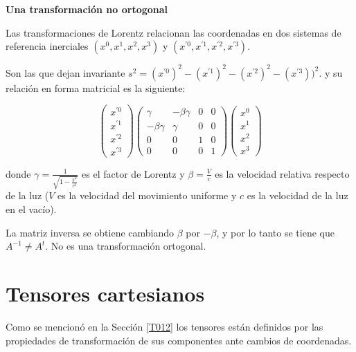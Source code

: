 \bigskip
\begin{example}
\textbf{Una transformación no ortogonal}

Las transformaciones de Lorentz relacionan las coordenadas en dos sistemas de referencia inerciales
$( x^0, x^1, x^2, x^3) $  y $  (x^{\prime 0}, x^{\prime 1}, x^{\prime 2}, x^{\prime 3})$.

Son las que dejan invariante 
$ s^2=  (x^{\prime 0})^2- (x^{\prime 1})^2 - ( x^{\prime 2})^2- (x^{\prime 3}))^2$.
\noindent
y su relación en forma matricial es la siguiente:



$$\left( \begin{array}{c} x^{\prime 0} \\ x^{\prime 1} 
\\  x^{\prime 2}\\ x^{\prime 3} 
\end{array}
 \right)  \left(\begin{array}{cccc} \gamma & -\beta \gamma &  0 & 0 \\-\beta \gamma  & \gamma & 0  & 0
\\  0 & 0  &  1 & 0 \\ 0 & 0 & 0 & 1
\end{array}
 \right)\left(\begin{array}{c} x^{0} \\ x^{1} 
\\  x^{2}\\ x^{3} 
\end{array}\right) $$
 
\bigskip
 
donde $\gamma = \frac{1}{\sqrt{1-\frac{V^2}{c^2}}}$ es el factor de Lorentz 
y $\beta= \frac{V}{c}$ es la velocidad relativa respecto de la luz ($V$ es la velocidad del movimiento uniforme y $c$ es la velocidad de la luz en el vacío).

La matriz inversa  se obtiene cambiando $\beta$ por $-\beta$, y por lo tanto se tiene que $A^{-1} \neq A^t$. No es una transformación ortogonal.
\end{example}






\section{Tensores cartesianos}
Como se  mencionó  en la Sección \ref{T012} los tensores están definidos por las propiedades de transformación de sus componentes ante cambios de coordenadas. 

